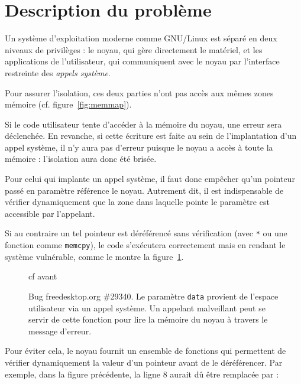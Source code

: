 \section{Description du problème}

\wip{}


Un système d'exploitation moderne comme GNU/Linux est séparé en deux niveaux de
privilèges : le noyau, qui gère directement le matériel, et les applications de
l'utilisateur, qui communiquent avec le noyau par l'interface restreinte des
\emph{appels système}.

Pour assurer l'isolation, ces deux parties n'ont pas accès aux mêmes zones
mémoire (cf. figure~\ref{fig:memmap}).

Si le code utilisateur tente d'accéder à la mémoire du noyau, une erreur sera
déclenchée. En revanche, si cette écriture est faite au sein de l'implantation
d'un appel système, il n'y aura pas d'erreur puisque le noyau a accès à toute la
mémoire : l'isolation aura donc été brisée.

Pour celui qui implante un appel système, il faut donc empêcher qu'un pointeur
passé en paramètre référence le noyau. Autrement dit, il est indispensable de
vérifier dynamiquement que la zone dans laquelle pointe le paramètre est
accessible par l'appelant\cite{hardy88confused}.

Si au contraire un tel pointeur est déréférencé sans vérification (avec
\texttt{*} ou une fonction comme \texttt{memcpy}), le code s'exécutera
correctement mais en rendant le système vulnérable, comme le montre la
figure~\ref{fig:radeon-bug}.


\begin{figure}
  cf avant

  \caption[Bug freedesktop.org \#29340]{Bug freedesktop.org \#29340. Le
  paramètre \texttt{data} provient de l'espace utilisateur via un appel système.
  Un appelant malveillant peut se servir de cette fonction pour lire la mémoire
  du noyau à travers le message d'erreur.}

  \label{fig:radeon-bug}
\end{figure}

Pour éviter cela, le noyau fournit un ensemble de fonctions qui permettent de
vérifier dynamiquement la valeur d'un pointeur avant de le déréférencer. Par
exemple, dans la figure précédente, la ligne 8 aurait dû être remplacée par :

